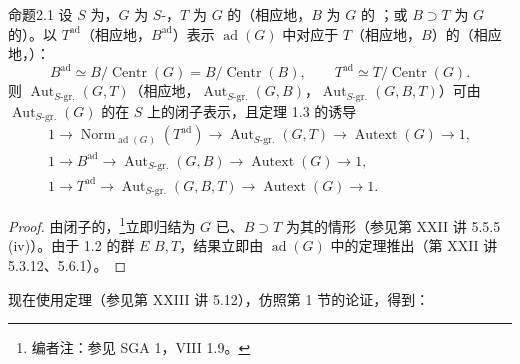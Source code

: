 \begin{SGAresult}{命题}{2.1}
设 $S$ 为，$G$ 为 $S$-，$T$ 为 $G$ 的（相应地，$B$ 为 $G$ 的 ；或 $B\supset T$ 为 $G$ 的）。以 $T^{\mathrm{ad}}$（相应地，$B^{\mathrm{ad}}$）表示 $\operatorname{ad}(G)$ 中对应于 $T$（相应地，$B$）的（相应地，）：
\[B^{\mathrm{ad}}\simeq B/\operatorname{Centr}(G)=B/\operatorname{Centr}(B),\qquad T^{\mathrm{ad}}\simeq T/\operatorname{Centr}(G).\]
则 $\operatorname{Aut}_{S\text{-gr.}}(G,T)$（相应地，$\operatorname{Aut}_{S\text{-gr.}}(G,B)$，$\operatorname{Aut}_{S\text{-gr.}}(G,B,T)$）可由 $\operatorname{Aut}_{S\text{-gr.}}(G)$ 的在 $S$ 上的闭子表示，且定理 1.3 的诱导
\begin{gather*}
1\longrightarrow\operatorname{Norm}_{\operatorname{ad}(G)}(T^{\mathrm{ad}})\longrightarrow\operatorname{Aut}_{S\text{-gr.}}(G,T)\longrightarrow\operatorname{Autext}(G)\longrightarrow1,\\
1\longrightarrow B^{\mathrm{ad}}\longrightarrow\operatorname{Aut}_{S\text{-gr.}}(G,B)\longrightarrow\operatorname{Autext}(G)\longrightarrow1,\\
1\longrightarrow T^{\mathrm{ad}}\longrightarrow\operatorname{Aut}_{S\text{-gr.}}(G,B,T)\longrightarrow\operatorname{Autext}(G)\longrightarrow1.
\end{gather*}
\end{SGAresult}
\begin{proof}
由闭子的，\footnote[12]{编者注：参见 SGA 1，VIII 1.9。}立即归结为 $G$ 已、$B\supset T$ 为其的情形（参见第 XXII 讲 5.5.5 (iv)）。由于 1.2 的群 $E$  $B,T$，结果立即由 $\operatorname{ad}(G)$ 中的定理推出（第 XXII 讲 5.3.12、5.6.1）。
\end{proof}
现在使用定理（参见第 XXIII 讲 5.12），仿照第 1 节的论证，得到：
